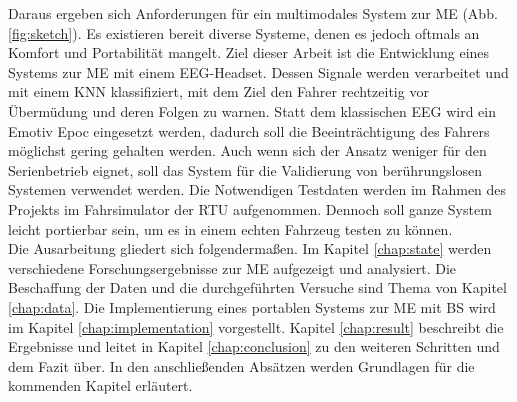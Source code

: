 Daraus ergeben sich Anforderungen für ein multimodales System zur \acl{ME}  (Abb. \ref{fig:sketch}). Es existieren bereit diverse Systeme, denen es jedoch oftmals an Komfort und Portabilität mangelt. Ziel dieser Arbeit ist die Entwicklung eines Systems zur \acl{ME} mit einem EEG-Headset. 
Dessen Signale werden verarbeitet und mit einem KNN klassifiziert, mit dem Ziel den Fahrer rechtzeitig vor Übermüdung und deren Folgen zu warnen.
Statt dem klassischen EEG wird ein Emotiv Epoc eingesetzt werden, dadurch  soll die Beeinträchtigung des Fahrers möglichst gering gehalten
werden. Auch wenn sich der Ansatz weniger für den Serienbetrieb eignet, soll das System für die Validierung von berührungslosen Systemen verwendet werden. Die Notwendigen Testdaten werden im Rahmen des Projekts im Fahrsimulator der \acl{RTU} aufgenommen. Dennoch soll ganze System leicht portierbar sein, um es in einem echten Fahrzeug testen zu können.
\\ 

Die Ausarbeitung gliedert sich folgendermaßen. Im Kapitel \ref{chap:state} werden verschiedene Forschungsergebnisse zur \acl{ME} aufgezeigt und analysiert. Die Beschaffung der Daten und die durchgeführten Versuche sind  Thema von Kapitel \ref{chap:data}. Die Implementierung eines portablen Systems zur \acl{ME} mit \acl{BS} wird im Kapitel \ref{chap:implementation} vorgestellt. Kapitel \ref{chap:result} beschreibt die Ergebnisse und leitet in Kapitel \ref{chap:conclusion} zu den weiteren Schritten und dem Fazit über. In den anschließenden Absätzen werden Grundlagen für die kommenden Kapitel erläutert.